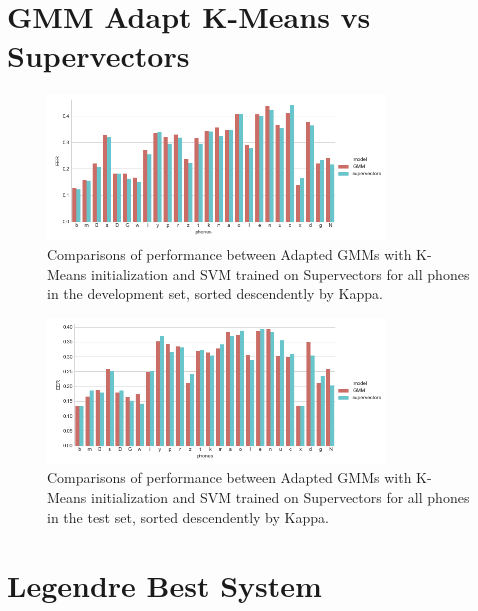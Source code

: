 \section{GMM Adapt K-Means vs Supervectors}

\begin{figure}[H]
	\centering
	\includegraphics[width=0.8\textwidth]{files/figures/results/gmm-vs-supervectors/gmm-vs-supervectors-dev.png}
	\caption{Comparisons of performance between Adapted GMMs with K-Means initialization
	and SVM trained on Supervectors for all phones in the development set, sorted
	descendently by Kappa.}
	\label{fig:gmmSupervectorsDev}
\end{figure}

\begin{figure}[H]
	\centering
	\includegraphics[width=0.8\textwidth]{files/figures/results/gmm-vs-supervectors/gmm-vs-supervectors-heldout.png}
	\caption{Comparisons of performance between Adapted GMMs with K-Means initialization
	and SVM trained on Supervectors for all phones in the test set, sorted descendently
	by Kappa.}
	\label{fig:gmmSupervectorsTest}
\end{figure}


\section{Legendre Best System}

